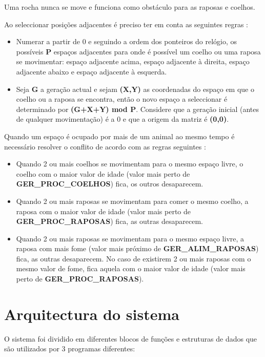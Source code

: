 \documentclass[12pt]{article}
\begin{document}
Uma rocha nunca se move e funciona como obstáculo para as raposas e coelhos.

Ao seleccionar posições adjacentes é preciso ter em conta as seguintes regras \cite{enunciado}:

\begin{itemize}
  \item Numerar a partir de 0 e seguindo a ordem dos ponteiros do relógio, os possíveis \textbf{P} espaços adjacentes para onde é possível um coelho ou uma raposa se movimentar: espaço adjacente acima, espaço adjacente à direita, espaço adjacente abaixo e espaço adjacente à esquerda.
  \item Seja \textbf{G} a geração actual e sejam \textbf{(X,Y)} as coordenadas do espaço em que o coelho ou a raposa se encontra, então o novo espaço a seleccionar é determinado por \textbf{(G+X+Y) mod P}. Considere que a geração inicial (antes de qualquer movimentação) é a 0 e que a origem da matriz é \textbf{(0,0)}.
\end{itemize}

Quando um espaço é ocupado por mais de um animal ao mesmo tempo é necessário resolver o conflito de acordo com
as regras seguintes \cite{enunciado}:
\begin{itemize}
  \item Quando 2 ou mais coelhos se movimentam para o mesmo espaço livre, o coelho com o maior valor de idade (valor mais perto de \textbf{GER\_PROC\_COELHOS}) fica, os outros desaparecem.
  \item Quando 2 ou mais raposas se movimentam para comer o mesmo coelho, a raposa com o maior valor de idade (valor mais perto de \textbf{GER\_PROC\_RAPOSAS}) fica, as outras desaparecem.
  \item Quando 2 ou mais raposas se movimentam para o mesmo espaço livre, a raposa com mais fome (valor mais próximo de \textbf{GER\_ALIM\_RAPOSAS}) fica, as outras desaparecem. No caso de existirem 2 ou mais raposas com o mesmo valor de fome, fica aquela com o maior valor de idade (valor mais perto de \textbf{GER\_PROC\_RAPOSAS}).
\end{itemize}

\section{Arquitectura do sistema} \label{sec:arq}

O sistema foi dividido em diferentes blocos de funções e estruturas de dados que são
utilizados por 3 programas diferentes:
\end{document}
